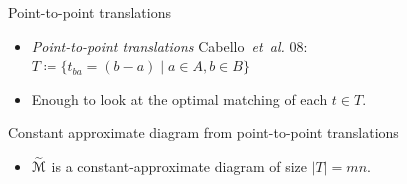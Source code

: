 \documentclass[xcolor={dvipsnames,usenames}]{beamer}
\newcommand{\mycite}[1]{{\color{LimeGreen}\lbrack #1\rbrack}}
\newcommand{\etal}{\textit{et~al.}}
\def\abs#1{\mathopen| #1 \mathclose|}		%
\newcommand{\tildeM}{\widetilde{\EuScript{M}}}
\def\EMPH#1{\textcolor{BrickRed}{{\emph{#1}}}}
\begin{document}
\begin{frame}{Point-to-point translations}
\begin{itemize}
\item \EMPH{Point-to-point translations} \mycite{Cabello~{\etal} 08}:
	$T \coloneqq \{t_{ba} = (b - a) \mid a \in A, b \in B\}$
\item Enough to look at the optimal matching of each $t \in T$.
\end{itemize}
\end{frame}

\begin{frame}{Constant approximate diagram from point-to-point translations}
\begin{itemize}
\item $\tildeM$ is a constant-approximate diagram of size $\abs{T} = mn$.
\end{itemize}
\end{frame}
\end{document}
